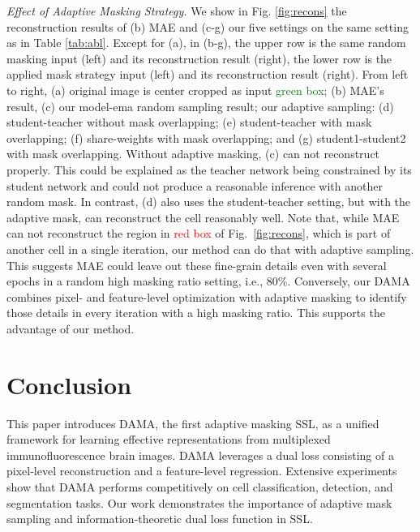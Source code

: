 \documentclass[10pt,twocolumn,letterpaper]{article}
\begin{document}
\textcolor{nblue}{\textit{Effect of Adaptive Masking Strategy.}}
We show in Fig. \ref{fig:recons} the reconstruction results of (b) MAE and (c-g) our five settings on the same setting as in Table \ref{tab:abl}. Except for (a), in (b-g), the upper row is the same random masking input  (left) and its reconstruction result  (right), the lower row is the applied mask strategy input  (left) and its reconstruction result  (right). From left to right, (a) original image is center cropped as input \textcolor{green}{green box}; (b) MAE's result, (c) our model-ema random sampling result; our adaptive sampling: (d) student-teacher without mask overlapping; (e) student-teacher with mask overlapping; (f) share-weights with mask overlapping; and (g) student1-student2 with mask overlapping. Without adaptive masking, (c) can not reconstruct properly. This could be explained as the teacher network being constrained by its student network and could not produce a reasonable inference with another random mask. In contrast, (d) also uses the student-teacher setting, but with the adaptive mask, can reconstruct the cell reasonably well. Note that, while MAE can not reconstruct the region in \textcolor{red}{red box} of Fig.~\ref{fig:recons}, which is part of another cell in a single iteration, our method can do that with adaptive sampling. This suggests MAE could leave out these fine-grain details even with several epochs in a random high masking ratio setting, i.e., 80\%. Conversely, our DAMA combines pixel- and feature-level optimization with adaptive masking to identify those details in every iteration with a high masking ratio. This supports the advantage of our method.

\section{Conclusion}
This paper introduces DAMA, the first adaptive masking SSL, as a unified framework for learning effective representations from multiplexed immunofluorescence brain images. DAMA leverages a dual loss consisting of a pixel-level reconstruction and a feature-level regression. Extensive experiments show that DAMA performs competitively on cell classification, detection, and segmentation tasks. Our work demonstrates the importance of adaptive mask sampling and information-theoretic dual loss function in SSL.

{\small


}
\end{document}
